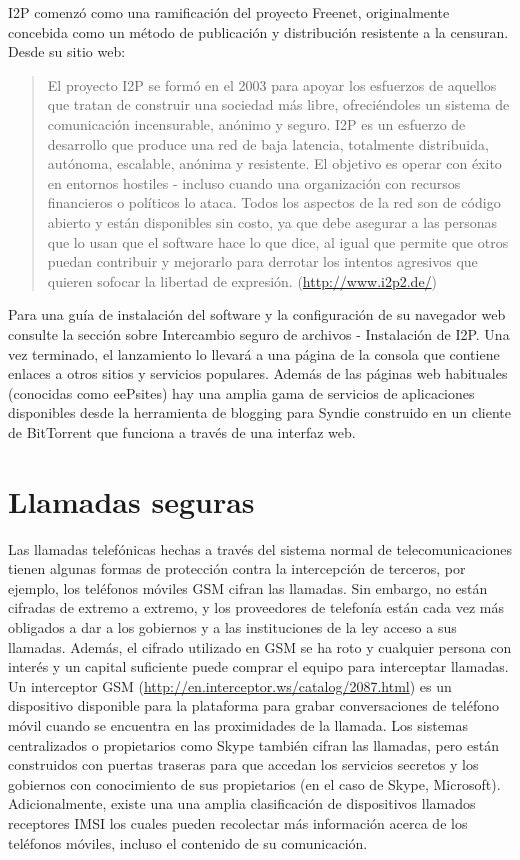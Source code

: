 \documentclass[10pt,a5paper,twoside,,]{book}
\begin{document}
I2P comenzó como una ramificación del proyecto Freenet, originalmente
concebida como un método de publicación y distribución resistente a la
censuran. Desde su sitio web:

\begin{quote}
El proyecto I2P se formó en el 2003 para apoyar los esfuerzos de
aquellos que tratan de construir una sociedad más libre, ofreciéndoles
un sistema de comunicación incensurable, anónimo y seguro. I2P es un
esfuerzo de desarrollo que produce una red de baja latencia, totalmente
distribuida, autónoma, escalable, anónima y resistente. El objetivo es
operar con éxito en entornos hostiles - incluso cuando una organización
con recursos financieros o políticos lo ataca. Todos los aspectos de la
red son de código abierto y están disponibles sin costo, ya que debe
asegurar a las personas que lo usan que el software hace lo que dice, al
igual que permite que otros puedan contribuir y mejorarlo para derrotar
los intentos agresivos que quieren sofocar la libertad de expresión.
(\url{http://www.i2p2.de/})
\end{quote}

Para una guía de instalación del software y la configuración de su
navegador web consulte la sección sobre Intercambio seguro de archivos -
Instalación de I2P. Una vez terminado, el lanzamiento lo llevará a una
página de la consola que contiene enlaces a otros sitios y servicios
populares. Además de las páginas web habituales (conocidas como
eePsites) hay una amplia gama de servicios de aplicaciones disponibles
desde la herramienta de blogging para Syndie construido en un cliente de
BitTorrent que funciona a través de una interfaz web.

\chapter{Llamadas seguras}\label{llamadas-seguras}

Las llamadas telefónicas hechas a través del sistema normal de
telecomunicaciones tienen algunas formas de protección contra la
intercepción de terceros, por ejemplo, los teléfonos móviles GSM cifran
las llamadas. Sin embargo, no están cifradas de extremo a extremo, y los
proveedores de telefonía están cada vez más obligados a dar a los
gobiernos y a las instituciones de la ley acceso a sus llamadas. Además,
el cifrado utilizado en GSM se ha roto y cualquier persona con interés y
un capital suficiente puede comprar el equipo para interceptar llamadas.
Un interceptor GSM
(\href{http://en.intercept.ws/catalog/2087.html}{http://en.interceptor.ws/catalog/2087.html})
es un dispositivo disponible para la plataforma para grabar
conversaciones de teléfono móvil cuando se encuentra en las proximidades
de la llamada. Los sistemas centralizados o propietarios como Skype
también cifran las llamadas, pero están construidos con puertas traseras
para que accedan los servicios secretos y los gobiernos con conocimiento
de sus propietarios (en el caso de Skype, Microsoft). Adicionalmente,
existe una una amplia clasificación de dispositivos llamados receptores
IMSI los cuales pueden recolectar más información acerca de los
teléfonos móviles, incluso el contenido de su comunicación.
\end{document}
